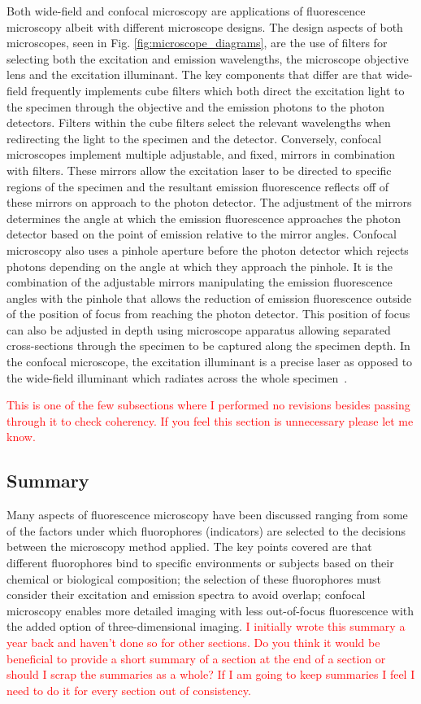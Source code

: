 Both wide-field and confocal microscopy are applications of fluorescence microscopy albeit with different microscope designs. The design aspects of both microscopes, seen in Fig. \ref{fig:microscope_diagrams}, are the use of filters for selecting both the excitation and emission wavelengths, the microscope objective lens and the excitation illuminant. The key components that differ are that wide-field frequently implements cube filters which both direct the excitation light to the specimen through the objective and the emission photons to the photon detectors. Filters within the cube filters select the relevant wavelengths when redirecting the light to the specimen and the detector. Conversely, confocal microscopes implement multiple adjustable, and fixed, mirrors in combination with filters. These mirrors allow the excitation laser to be directed to specific regions of the specimen and the resultant emission fluorescence reflects off of these mirrors on approach to the photon detector. The adjustment of the mirrors determines the angle at which the emission fluorescence approaches the photon detector based on the point of emission relative to the mirror angles. Confocal microscopy also uses a pinhole aperture before the photon detector which rejects photons depending on the angle at which they approach the pinhole. It is the combination of the adjustable mirrors manipulating the emission fluorescence angles with the pinhole that allows the reduction of emission fluorescence outside of the position of focus from reaching the photon detector. This position of focus can also be adjusted in depth using microscope apparatus allowing separated cross-sections through the specimen to be captured along the specimen depth. In the confocal microscope, the excitation illuminant is a precise laser as opposed to the wide-field illuminant which radiates across the whole specimen~\cite{Sanderson-2014}.\par
\textcolor{red}{This is one of the few subsections where I performed no revisions besides passing through it to check coherency. If you feel this section is unnecessary please let me know.}
\subsection{Summary}
Many aspects of fluorescence microscopy have been discussed ranging from some of the factors under which fluorophores (indicators) are selected to the decisions between the microscopy method applied. The key points covered are that different fluorophores bind to specific environments or subjects based on their chemical or biological composition; the selection of these fluorophores must consider their excitation and emission spectra to avoid overlap; confocal microscopy enables more detailed imaging with less out-of-focus fluorescence with the added option of three-dimensional imaging.
\textcolor{red}{I initially wrote this summary a year back and haven't done so for other sections. Do you think it would be beneficial to provide a short summary of a section at the end of a section or should I scrap the summaries as a whole? If I am going to keep summaries I feel I need to do it for every section out of consistency.} 

